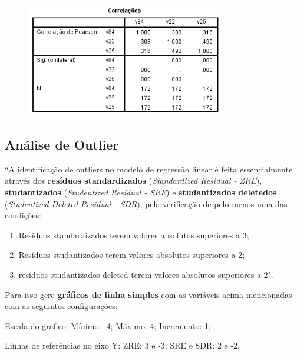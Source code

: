 			\begin{figure}[H]
				\centering
				\includegraphics[height=5cm]{images/rl_multicolinearidade}
			\end{figure}

	\subsection{Análise de Outlier}
	
		``A identificação de outliers no modelo de regressão linear é feita essencialmente através dos \textbf{resíduos standardizados} (\emph{Standardized Residual - ZRE}), \textbf{studantizados} (\emph{Studentized Residual - SRE}) e \textbf{studantizados deletedos} (\emph{Studentized Deleted Residual - SDR}), pela verificação de pelo menos uma das condições:

		\begin{enumerate}[label=(\alph*)]
		
			\item Resíduos standardizados terem valores absolutos superiores a 3;			
			\item Resíduos studantizados terem valores absolutos superiores a 2;
			\item resíduos studantizados deleted terem valores absolutos superiores a 2". \cite{torres}
			
		\end{enumerate}

		Para isso gere \textbf{gráficos de linha simples} com as variáveis acima mencionadas com as seguintes configurações:
			
		Escala do gráfico: Mínimo: -4; Máximo: 4; Incremento: 1;

		Linhas de referências no eixo Y: ZRE: 3 e -3; SRE e SDR: 2 e -2.
			
